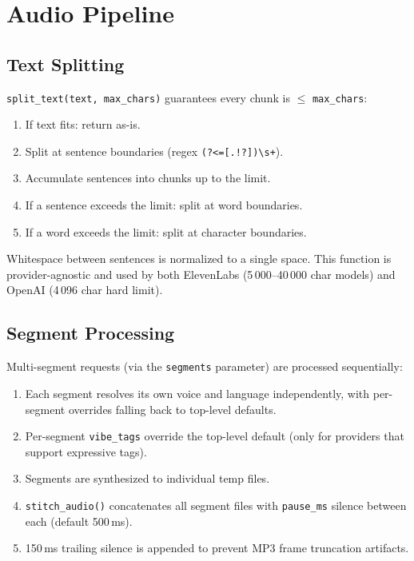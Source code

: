 \documentclass[a4paper,10pt]{article}
\newcommand{\field}[1]{\texttt{#1}}
\begin{document}
\section{Audio Pipeline}

\subsection{Text Splitting}

\texttt{split\_text(text, max\_chars)} guarantees every chunk is
$\leq$ \texttt{max\_chars}:

\begin{enumerate}
  \item If text fits: return as-is.
  \item Split at sentence boundaries (regex
    \texttt{(?<=[.!?])\textbackslash{}s+}).
  \item Accumulate sentences into chunks up to the limit.
  \item If a sentence exceeds the limit: split at word boundaries.
  \item If a word exceeds the limit: split at character boundaries.
\end{enumerate}

Whitespace between sentences is normalized to a single space.
This function is provider-agnostic and used by both ElevenLabs
(5\,000--40\,000 char models) and OpenAI (4\,096 char hard limit).

\subsection{Segment Processing}

Multi-segment requests (via the \field{segments} parameter) are
processed sequentially:

\begin{enumerate}
  \item Each segment resolves its own voice and language
    independently, with per-segment overrides falling back to
    top-level defaults.
  \item Per-segment \field{vibe\_tags} override the top-level
    default (only for providers that support expressive tags).
  \item Segments are synthesized to individual temp files.
  \item \texttt{stitch\_audio()} concatenates all segment files
    with \field{pause\_ms} silence between each (default 500\,ms).
  \item 150\,ms trailing silence is appended to prevent MP3 frame
    truncation artifacts.
\end{enumerate}
\end{document}
